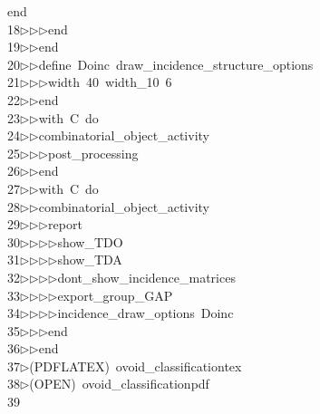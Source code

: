 \begin{tabbing}
\>end\ \\[0pt]
18\>$\triangleright$\>$\triangleright$\>$\triangleright$\>end\ \\[0pt]
19\>$\triangleright$\>$\triangleright$\>end\ \\[0pt]
20\>$\triangleright$\>$\triangleright$\>define\ Doinc\ draw\_incidence\_structure\_options\ \\[0pt]
21\>$\triangleright$\>$\triangleright$\>$\triangleright$\>width\ 40\ width\_10\ 6\ \\[0pt]
22\>$\triangleright$\>$\triangleright$\>end\ \\[0pt]
23\>$\triangleright$\>$\triangleright$\>with\ C\ do\ \\[0pt]
24\>$\triangleright$\>$\triangleright$\>combinatorial\_object\_activity\ \\[0pt]
25\>$\triangleright$\>$\triangleright$\>$\triangleright$\>post\_processing\ \\[0pt]
26\>$\triangleright$\>$\triangleright$\>end\ \\[0pt]
27\>$\triangleright$\>$\triangleright$\>with\ C\ do\ \\[0pt]
28\>$\triangleright$\>$\triangleright$\>combinatorial\_object\_activity\ \\[0pt]
29\>$\triangleright$\>$\triangleright$\>$\triangleright$\>report\ \\[0pt]
30\>$\triangleright$\>$\triangleright$\>$\triangleright$\>$\triangleright$\>show\_TDO\ \\[0pt]
31\>$\triangleright$\>$\triangleright$\>$\triangleright$\>$\triangleright$\>show\_TDA\ \\[0pt]
32\>$\triangleright$\>$\triangleright$\>$\triangleright$\>$\triangleright$\>dont\_show\_incidence\_matrices\ \\[0pt]
33\>$\triangleright$\>$\triangleright$\>$\triangleright$\>$\triangleright$\>export\_group\_GAP\ \\[0pt]
34\>$\triangleright$\>$\triangleright$\>$\triangleright$\>$\triangleright$\>incidence\_draw\_options\ Doinc\ \\[0pt]
35\>$\triangleright$\>$\triangleright$\>$\triangleright$\>end\ \\[0pt]
36\>$\triangleright$\>$\triangleright$\>end\\[0pt]
37\>$\triangleright$\>(PDFLATEX)\ ovoid\_classificationtex\\[0pt]
38\>$\triangleright$\>(OPEN)\ ovoid\_classificationpdf\\[0pt]
39\>\end{tabbing}
